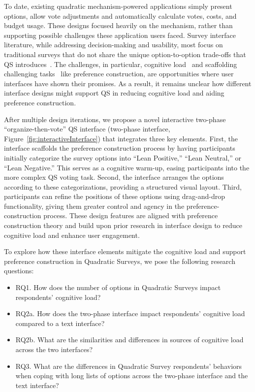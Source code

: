 To date, existing quadratic mechanism-powered applications simply present options, allow vote adjustments and automatically calculate votes, costs, and budget usage. These designs focused heavily on the mechanism, rather than supporting possible challenges these application users faced. Survey interface literature, while addressing decision-making and usability, most focus on traditional surveys that do not share the unique option-to-option trade-offs that QS introduces~\cite{engstrom2020politics, weijtersEffectRatingScale2010, kierujVariationsResponseStyle2010, toepoelSmileysStarsHearts2019, farzandAestheticsEvaluatingResponse2024, pielotDidYouMisclick2024}. The challenges, in particular, cognitive load~\cite{paula2023, norman2013design, toepoelSmileysStarsHearts2019, softwareBrad2021} and scaffolding challenging tasks~\cite{task2014, moderate2021, amyChatSensing2018} like preference construction, are opportunities where user interfaces have shown their promises. As a result, it remains unclear how different interface designs might support QS in reducing cognitive load and aiding preference construction.


After multiple design iterations, we propose a novel interactive two-phase ``organize-then-vote'' QS interface (two-phase interface, Figure~\ref{fig:interactiveInterface}) that integrates three key elements. First, the interface scaffolds the preference construction process by having participants initially categorize the survey options into ``Lean Positive,'' ``Lean Neutral,'' or ``Lean Negative.'' This serves as a cognitive warm-up, easing participants into the more complex QS voting task. Second, the interface arranges the options according to these categorizations, providing a structured visual layout. Third, participants can refine the positions of these options using drag-and-drop functionality, giving them greater control and agency in the preference-construction process. These design features are aligned with preference construction theory and build upon prior research in interface design to reduce cognitive load and enhance user engagement.

To explore how these interface elements mitigate the cognitive load and support preference construction in Quadratic Surveys, we pose the following research questions:
\begin{itemize}
    \item RQ1. How does the number of options in Quadratic Surveys impact respondents' cognitive load?
    \item RQ2a. How does the two-phase interface impact respondents' cognitive load compared to a text interface?
    \item RQ2b. What are the similarities and differences in sources of cognitive load across the two interfaces?
    \item RQ3. What are the differences in Quadratic Survey respondents' behaviors when coping with long lists of options across the two-phase interface and the text interface?
\end{itemize}

